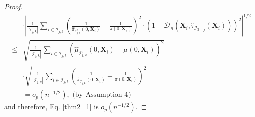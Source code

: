 \documentclass[11pt]{article}
\theoremstyle{referenceplain}
\theoremstyle{referencedefinition}
\theoremstyle{referenceremark}
\begin{document}
\begin{proof}
\begin{align*}
        &\cdot\left|\frac{1}{|\mathcal{I}_{j,k}|}\sum_{i\in\mathcal{I}_{j,k}}\left(\frac{1}{\widehat{\pi}_{\mathcal{I}_{j,k}^c}(0,\mathbf{X}_i)}-\frac{1}{\pi(0,\mathbf{X}_i)}\right)^2\cdot (1-\mathcal{D}_n(\mathbf{X}_i,\widehat{\tau}_{\mathcal{I}_{3-j}}(\mathbf{X}_i)))^2\right|^{1/2}\\
        \leq & \sqrt{\frac{1}{|\mathcal{I}_{j,k}|}\sum_{i\in\mathcal{I}_{j,k}} \left(\widehat{\mu}_{\mathcal{I}_{j,k}^c}(0,\mathbf{X}_i)-\mu(0,\mathbf{X}_i)\right)^2}\\
        &\cdot\sqrt{\frac{1}{|\mathcal{I}_{j,k}|}\sum_{i\in\mathcal{I}_{j,k}}\left(\frac{1}{\widehat{\pi}_{\mathcal{I}_{j,k}^c}(0,\mathbf{X}_i)}-\frac{1}{\pi(0,\mathbf{X}_i)}\right)^2}\\
        &=o_p(n^{-1/2}), \text{ (by Assumption 4)}
    \end{align*}
    and therefore, Eq. \eqref{thm2_1} is $o_p(n^{-1/2})$.
    

\end{proof}
\end{document}
